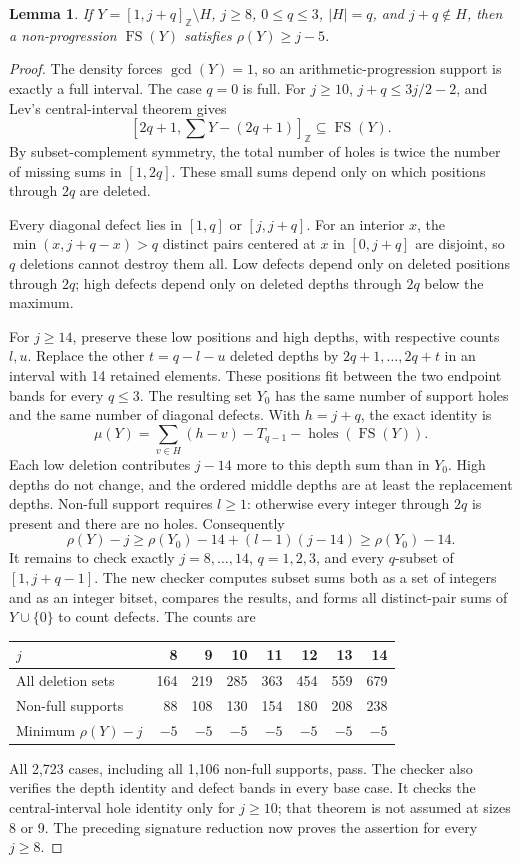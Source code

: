\documentclass[11pt,a4paper]{article}
\newcommand{\FS}{\operatorname{FS}}
\newcommand{\Z}{\mathbb Z}
\newtheorem{lemma}[theorem]{Lemma}
\begin{document}
\begin{lemma}\label{deleted}
If $Y=[1,j+q]_{\Z}\setminus H$, $j\ge8$, $0\le q\le3$, $|H|=q$,
and $j+q\notin H$, then a non-progression $\FS(Y)$ satisfies
$\rho(Y)\ge j-5$.
\end{lemma}
\begin{proof}
The density forces $\gcd(Y)=1$, so an arithmetic-progression support is
exactly a full interval. The case $q=0$ is full. For $j\ge10$,
$j+q\le3j/2-2$, and Lev's central-interval theorem
\cite[Theorem 1]{Lev1998} gives
\[
 [2q+1,\sum Y-(2q+1)]_{\Z}\subseteq\FS(Y).
\]
By subset-complement symmetry, the total number of holes is twice the
number of missing sums in $[1,2q]$. These small sums depend only on
which positions through $2q$ are deleted.

Every diagonal defect lies in $[1,q]$ or $[j,j+q]$. For an interior
$x$, the $\min(x,j+q-x)>q$ distinct pairs centered at $x$ in
$[0,j+q]$ are disjoint, so $q$ deletions cannot destroy them all.
Low defects depend only on deleted positions through $2q$; high defects
depend only on deleted depths through $2q$ below the maximum.

For $j\ge14$, preserve these low positions and high depths, with
respective counts $l,u$. Replace the other $t=q-l-u$ deleted depths
by $2q+1,\ldots,2q+t$ in an interval with 14 retained elements. These
positions fit between the two endpoint bands for every $q\le3$.
The resulting set $Y_0$ has the same number of support holes and the
same number of diagonal defects. With $h=j+q$, the exact identity is
\[
 \mu(Y)=\sum_{v\in H}(h-v)-T_{q-1}-\operatorname{holes}(\FS(Y)).
\]
Each low deletion contributes $j-14$ more to this depth sum than in
$Y_0$. High depths do not change, and the ordered middle depths are at
least the replacement depths. Non-full support requires $l\ge1$:
otherwise every integer through $2q$ is present and there are no holes.
Consequently
\[
 \rho(Y)-j\ge\rho(Y_0)-14+(l-1)(j-14)\ge\rho(Y_0)-14.
\]
It remains to check exactly $j=8,\ldots,14$, $q=1,2,3$, and every
$q$-subset of $[1,j+q-1]$. The new checker
 computes subset sums both as a set
of integers and as an integer bitset, compares the results, and forms
all distinct-pair sums of $Y\cup\{0\}$ to count defects. The counts are
\begin{center}\small
\begin{tabular}{lrrrrrrr}\toprule
$j$&8&9&10&11&12&13&14\\\midrule
All deletion sets&164&219&285&363&454&559&679\\
Non-full supports&88&108&130&154&180&208&238\\
Minimum $\rho(Y)-j$&$-5$&$-5$&$-5$&$-5$&$-5$&$-5$&$-5$\\\bottomrule
\end{tabular}
\end{center}
All 2,723 cases, including all 1,106 non-full supports, pass. The checker
also verifies the depth identity and defect bands in every base case.
It checks the central-interval hole identity only for $j\ge10$;
that theorem is not assumed at sizes 8 or 9. The preceding signature
reduction now proves the assertion for every $j\ge8$.
\end{proof}
\end{document}
